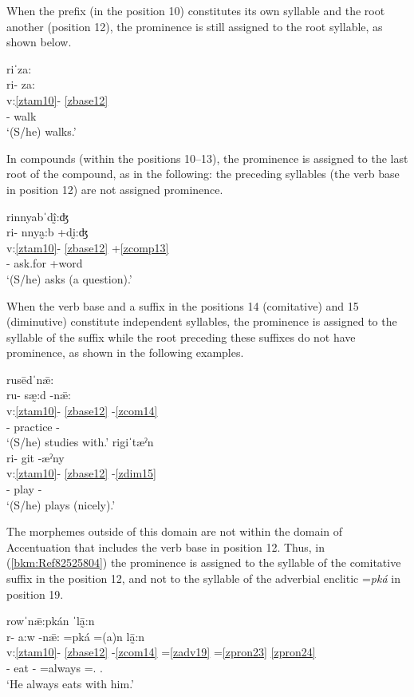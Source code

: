 \documentclass[output=paper]{langscibook}
\begin{document}
When the prefix (in the position 10) constitutes its own syllable and the root another (position 12), the prominence is still assigned to the root syllable, as shown below.

\ea\label{ex:key:zap:53}
{riˈza:}\\
\glll ri- za:\\
v:\ref{ztam10}- \ref{zbase12}\\
\Hab{}- walk\\
\glt `(S/he) walks.'
\z

In compounds (within the positions 10--13), the prominence is assigned to the last root of the compound, as in the following: the preceding syllables (the verb base in position 12) are not assigned prominence.

\ea\label{ex:key:zap:54}
{rinnyabˈdḭ̂:ʤ}\\
\glll ri- nnya̰:b +dḭ:ʤ\\
v:\ref{ztam10}- \ref{zbase12} +\ref{zcomp13} \\
\Hab{}- ask.for +word\\
\glt `(S/he) asks (a question).'
\z

When the verb base and a suffix in the positions 14 (comitative) and 15 (diminutive) constitute independent syllables, the prominence is assigned to the syllable of the suffix while the root preceding these suffixes do not have prominence, as shown in the following examples. 

\ea\label{ex:key:zap:55}
{rusēdˈnǣ:}\\
\glll ru- sæ̰:d -nǣ:\\
v:\ref{ztam10}- \ref{zbase12} {}-\ref{zcom14} \\
\Hab{}- practice -\Com{}\\
\glt  `(S/he) studies with.' 
\ex\label{ex:key:zap:56}
{rigiˈtæˀn}\\
\glll ri- git -æˀny\\
v:\ref{ztam10}- \ref{zbase12} {}-\ref{zdim15}\\
\Hab{}- play -\Dim{}\\
\glt `(S/he) plays (nicely).'
\z

The morphemes outside of this domain are not within the domain of Accentuation that includes the verb base in position 12. Thus, in (\ref{bkm:Ref82525804}) the prominence is assigned to the syllable of the comitative suffix in the position 12, and not to the syllable of the adverbial enclitic =\textit{pká} in position 19.

\ea\label{bkm:Ref82525804}
{rowˈn\={æ}:pkán ˈlā̰:n}\\
\glll r- a:w -n\={æ}: =pká =(a)n lā̰:n\\
v:\ref{ztam10}- \ref{zbase12} {}-\ref{zcom14} =\ref{zadv19} =\ref{zpron23} \ref{zpron24} \\
\Hab{}- eat -\Com{} =always =\Third\Sg{}.\Inf{} \Third\Sg{}.\For{}\\
\glt `He always eats with him.'
\z
\end{document}
